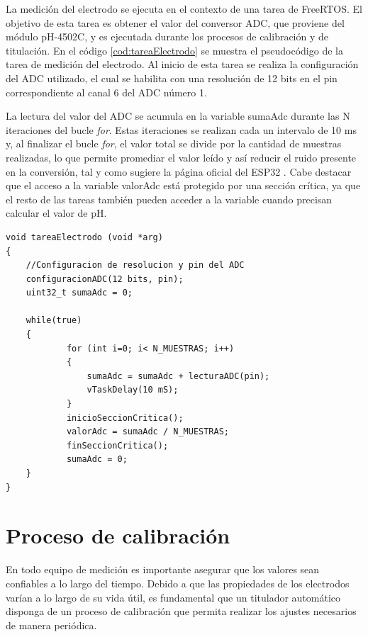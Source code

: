 La medición del electrodo se ejecuta en el contexto de una tarea de FreeRTOS. El objetivo de esta tarea es obtener el valor del conversor ADC, que proviene del módulo pH-4502C, y es ejecutada durante los procesos de calibración y de titulación. En el código \ref{cod:tareaElectrodo} se muestra el pseudocódigo de la tarea de medición del electrodo. Al inicio de esta tarea se realiza la configuración del ADC utilizado, el cual se habilita con una resolución de 12 bits en el pin correspondiente al canal 6 del ADC número 1.

La lectura del valor del ADC se acumula en la variable sumaAdc durante las N iteraciones del bucle \textit{for}. Estas iteraciones se realizan cada un intervalo de 10 ms y, al finalizar el bucle \textit{for}, el valor total se divide por la cantidad de muestras realizadas, lo que permite promediar el valor leído y así reducir el ruido presente en la conversión, tal y como sugiere la página oficial del ESP32 \citep{WEBSITE:2}. Cabe destacar que el acceso a la variable valorAdc está protegido por una sección crítica, ya que el resto de las tareas también pueden acceder a la variable cuando precisan calcular el valor de pH.

\begin{lstlisting}[label=cod:tareaElectrodo,caption=Pseudocódigo de la tarea de medición de pH.]
void tareaElectrodo (void *arg)
{
    //Configuracion de resolucion y pin del ADC
    configuracionADC(12 bits, pin);
    uint32_t sumaAdc = 0;

    while(true)
    {
    		for (int i=0; i< N_MUESTRAS; i++)
    		{
        		sumaAdc = sumaAdc + lecturaADC(pin);  
        		vTaskDelay(10 mS);
    		} 
    		inicioSeccionCritica(); 
    		valorAdc = sumaAdc / N_MUESTRAS;
    		finSeccionCritica();
    		sumaAdc = 0;
    }
}
\end{lstlisting}

\section{Proceso de calibración}

En todo equipo de medición es importante asegurar que los valores sean confiables a lo largo del tiempo. Debido a que las propiedades de los electrodos varían a lo largo de su vida útil, es fundamental que un titulador automático disponga de un proceso de calibración que permita realizar los ajustes necesarios de manera periódica.

